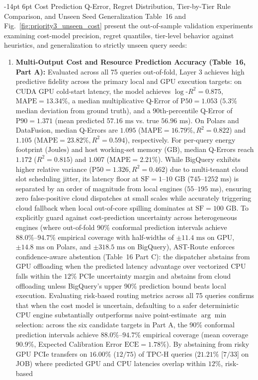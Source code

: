 \documentclass[10pt,a4paper]{article}
\makeatletter
\renewcommand\subsection{\@startsection{subsection}{2}{\z@}%
  {-14pt \@plus -3pt \@minus -1.5pt}%
  {6pt \@plus 1.5pt}%
  {\normalfont\normalsize\bfseries}}
\makeatother
\begin{document}
\subsection{Cost Prediction Q-Error, Regret Distribution, Tier-by-Tier Rule Comparison, and Unseen Seed Generalization}
Table~16 and Fig.~\ref{fig:priority3_unseen_cost} present the out-of-sample validation experiments examining cost-model precision, regret quantiles, tier-level behavior against heuristics, and generalization to strictly unseen query seeds:
\begin{enumerate}[leftmargin=1.5em,itemsep=2pt]
    \item \textbf{Multi-Output Cost and Resource Prediction Accuracy (Table~16, Part A):} Evaluated across all 75 queries out-of-fold, Layer 3 achieves high predictive fidelity across the primary local and GPU execution targets: on CUDA GPU cold-start latency, the model achieves $\log\text{-}R^2 = \mathbf{0.875}$, $\text{MAPE} = \mathbf{13.34\%}$, a median multiplicative Q-Error of $\text{P50} = \mathbf{1.053}$ ($5.3\%$ median deviation from ground truth), and a 90th-percentile Q-Error of $\text{P90} = \mathbf{1.371}$ (mean predicted $57.16\text{ ms}$ vs. true $56.96\text{ ms}$). On Polars and DataFusion, median Q-Errors are $\mathbf{1.095}$ ($\text{MAPE}=16.79\%, R^2=0.822$) and $\mathbf{1.105}$ ($\text{MAPE}=23.82\%, R^2=0.594$), respectively. For per-query energy footprint ($\text{Joules}$) and host working-set memory ($\text{GB}$), median Q-Errors reach $\mathbf{1.172}$ ($R^2=0.815$) and $\mathbf{1.007}$ ($\text{MAPE}=2.21\%$). While BigQuery exhibits higher relative variance ($\text{P50}=1.326, R^2=0.462$) due to multi-tenant cloud slot scheduling jitter, its latency floor at $\text{SF}=1\text{--}10\text{ GB}$ ($745\text{--}1252\text{ ms}$) is separated by an order of magnitude from local engines ($55\text{--}195\text{ ms}$), ensuring zero false-positive cloud dispatches at small scales while accurately triggering cloud fallback when local out-of-core spilling dominates at $\text{SF}=100\text{ GB}$. To explicitly guard against cost-prediction uncertainty across heterogeneous engines (where out-of-fold 90\% conformal prediction intervals achieve $88.0\%\text{--}94.7\%$ empirical coverage with half-widths of $\pm 11.4\text{ ms}$ on GPU, $\pm 14.8\text{ ms}$ on Polars, and $\pm 318.5\text{ ms}$ on BigQuery), AST-Route enforces confidence-aware abstention (Table~16 Part C): the dispatcher abstains from GPU offloading when the predicted latency advantage over vectorized CPU falls within the $12\%$ PCIe uncertainty margin and abstains from cloud offloading unless BigQuery's upper 90\% prediction bound beats local execution. Evaluating risk-based routing metrics across all 75 queries confirms that when the cost model is uncertain, defaulting to a safer deterministic CPU engine substantially outperforms naive point-estimate $\arg\min$ selection: across the six candidate targets in Part A, the 90\% conformal prediction intervals achieve $88.0\%\text{--}94.7\%$ empirical coverage (mean coverage $90.9\%$, Expected Calibration Error $\text{ECE}=1.78\%$). By abstaining from risky GPU PCIe transfers on $16.00\%$ ($12/75$) of TPC-H queries ($21.21\%$ [$7/33$] on JOB) where predicted GPU and CPU latencies overlap within $12\%$, risk-based 
\end{enumerate}
\end{document}
